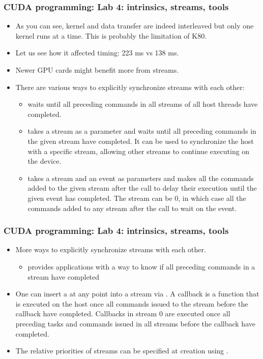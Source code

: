\begin{frame}[fragile]
  \frametitle{CUDA programming: Lab 4: intrinsics, streams, tools}
\begin{itemize}
\item As you can see, kernel and data transfer are indeed interleaved but only one kernel runs at a time. This is probably the limitation of K80.
\item Let us see how it affected timing: 223 ms vs 138 ms.
\item Newer GPU cards might benefit more from streams.
\item There are various ways to explicitly synchronize streams with each other:
  \begin{itemize}
  \item {} waits until all preceding commands in all streams of all
    host threads have completed.
  \item {} takes a stream as a parameter and waits until all preceding
    commands in the given stream have completed. It can be used to synchronize the host
    with a specific stream, allowing other streams to continue executing on the device.
  \item {} takes a stream and an event as parameters and makes all the commands added to the given stream after
    the call to  delay their execution until the given event has
    completed. The stream can be 0, in which case all the commands added to any stream
    after the call to  wait on the event.
  \end{itemize}
\end{itemize}
\end{frame}

\begin{frame}[fragile]
  \frametitle{CUDA programming: Lab 4: intrinsics, streams, tools}
\begin{itemize}
\item More ways to explicitly synchronize streams with each other.
  \begin{itemize}
  \item {} provides applications with a way to know if all preceding
    commands in a stream have completed
  \end{itemize}
  \item One can insert a  at any point into a stream via
    . A callback is a function that is executed on the host once
    all commands issued to the stream before the callback have completed. Callbacks in
    stream 0 are executed once all preceding tasks and commands issued in all streams
    before the callback have completed.
  \item The relative priorities of streams can be specified at creation using
    .
\end{itemize}
\end{frame}

